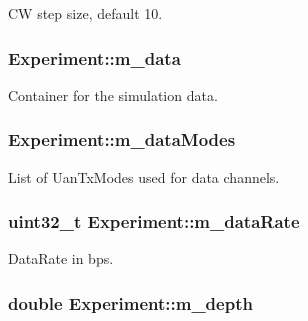 CW step size, default 10. 

\subsubsection[{\texorpdfstring{m\+\_\+data}{m_data}}]{ Experiment\+::m\+\_\+data}\hypertarget{classExperiment_a5fe417dad739b40ddbf9ee144842ce8f}{}\label{classExperiment_a5fe417dad739b40ddbf9ee144842ce8f}


Container for the simulation data. 

\subsubsection[{\texorpdfstring{m\+\_\+data\+Modes}{m_dataModes}}]{ Experiment\+::m\+\_\+data\+Modes}\hypertarget{classExperiment_a4a7d5680962fc1018b9eaab99475db55}{}\label{classExperiment_a4a7d5680962fc1018b9eaab99475db55}


List of Uan\+Tx\+Modes used for data channels. 

\subsubsection[{\texorpdfstring{m\+\_\+data\+Rate}{m_dataRate}}]{\setlength{\rightskip}{0pt plus 5cm}uint32\+\_\+t Experiment\+::m\+\_\+data\+Rate}\hypertarget{classExperiment_a5b781fcc8b0242604e4378c1df035228}{}\label{classExperiment_a5b781fcc8b0242604e4378c1df035228}


Data\+Rate in bps. 

\subsubsection[{\texorpdfstring{m\+\_\+depth}{m_depth}}]{\setlength{\rightskip}{0pt plus 5cm}double Experiment\+::m\+\_\+depth}\hypertarget{classExperiment_a15a89f9eb4b0e8ca6e640208c89126eb}{}\label{classExperiment_a15a89f9eb4b0e8ca6e640208c89126eb}


